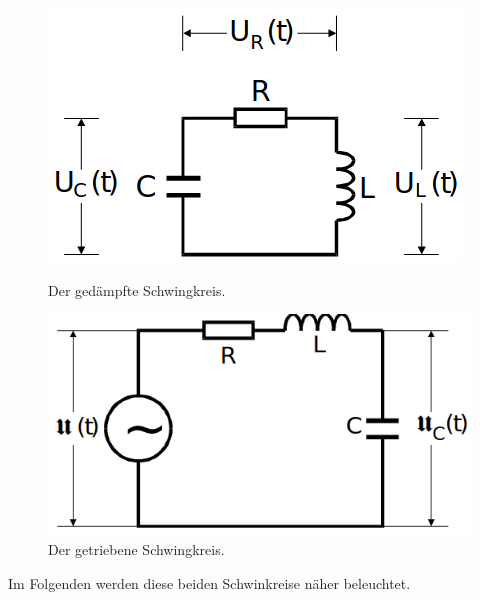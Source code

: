 \begin{figure}[H]
    \begin{minipage}[b]{.5\linewidth} %
       \includegraphics[width=\linewidth]{pictures/gedampft.png}
       \caption{Der gedämpfte Schwingkreis. \cite{AP01}}
       \label{fig:gedampft}
    \end{minipage}
    \hspace{.1\linewidth}%
    \begin{minipage}[b]{.4\linewidth} %
       \includegraphics[width=\linewidth]{pictures/getrieben.png}
       \caption{Der getriebene Schwingkreis. \cite{AP01}}
       \label{fig:getrieben}
    \end{minipage}
  \end{figure}
\noindent
Im Folgenden werden diese beiden Schwinkreise näher beleuchtet.

